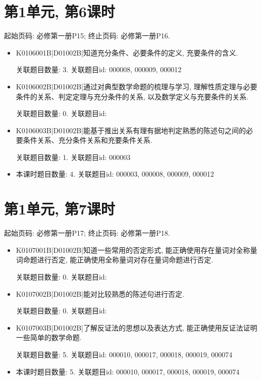 \section*{第1单元, 第6课时}
起始页码: 必修第一册P15; 终止页码: 必修第一册P16.
\begin{itemize}
\item K0106001B|D01002B|知道充分条件、必要条件的定义, 充要条件的含义.

关联题目数量: 3. 关联题目id: 000008, 000009, 000012

\item K0106002B|D01002B|通过对典型数学命题的梳理与学习, 理解性质定理与必要条件的关系、判定定理与充分条件的关系, 以及数学定义与充要条件的关系.

关联题目数量: 0. 关联题目id: 

\item K0106003B|D01002B|能基于推出关系有理有据地判定熟悉的陈述句之间的必要条件关系、充分条件关系和充要条件关系.

关联题目数量: 1. 关联题目id: 000003

\item 本课时题目数量: 4. 关联题目id: 000003, 000008, 000009, 000012

\end{itemize}

\section*{第1单元, 第7课时}
起始页码: 必修第一册P17; 终止页码: 必修第一册P18.
\begin{itemize}
\item K0107001B|D01002B|知道一些常用的否定形式, 能正确使用存在量词对全称量词命题进行否定, 能正确使用全称量词对存在量词命题进行否定.

关联题目数量: 0. 关联题目id: 

\item K0107002B|D01002B|能对比较熟悉的陈述句进行否定.

关联题目数量: 0. 关联题目id: 

\item K0107003B|D01002B|了解反证法的思想以及表达方式, 能正确使用反证法证明一些简单的数学命题.

关联题目数量: 5. 关联题目id: 000010, 000017, 000018, 000019, 000074

\item 本课时题目数量: 5. 关联题目id: 000010, 000017, 000018, 000019, 000074

\end{itemize}

